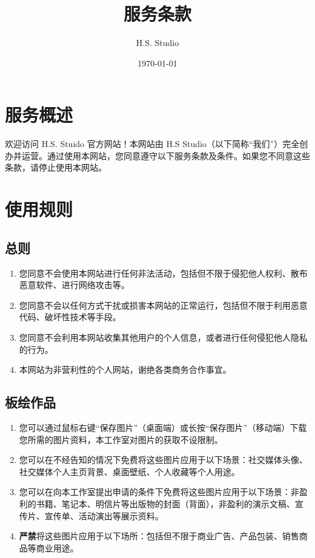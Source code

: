 \documentclass{article}
\title{服务条款}
\author{H.S. Studio}
\date{\today}
\begin{document}
\maketitle

\section*{服务概述}

欢迎访问 H.S. Stuido 官方网站！本网站由 H.S Studio（以下简称“我们”）完全创办并运营。通过使用本网站，您同意遵守以下服务条款及条件。如果您不同意这些条款，请停止使用本网站。

\section{使用规则}

\subsection*{总则}

\begin{enumerate}
    \item 您同意不会使用本网站进行任何非法活动，包括但不限于侵犯他人权利、散布恶意软件、进行网络攻击等。
    \item 您同意不会以任何方式干扰或损害本网站的正常运行，包括但不限于利用恶意代码、破坏性技术等手段。
    \item 您同意不会利用本网站收集其他用户的个人信息，或者进行任何侵犯他人隐私的行为。
    \item 本网站为非营利性的个人网站，谢绝各类商务合作事宜。
\end{enumerate}

\subsection*{板绘作品}

\begin{enumerate}
    \item 您可以通过鼠标右键“保存图片”（桌面端）或长按“保存图片”（移动端）下载您所需的图片资料，本工作室对图片的获取不设限制。
    \item 您可以在不经告知的情况下免费将这些图片应用于以下场景：社交媒体头像、社交媒体个人主页背景、桌面壁纸、个人收藏等个人用途。
    \item 您可以在向本工作室提出申请的条件下免费将这些图片应用于以下场景：非盈利的书籍、笔记本、明信片等出版物的封面（背面），非盈利的演示文稿、宣传片、宣传单、活动演出等展示资料。
    \item \textbf{严禁}将这些图片应用于以下场所：包括但不限于商业广告、产品包装、销售商品等商业用途。
\end{enumerate}
\end{document}
